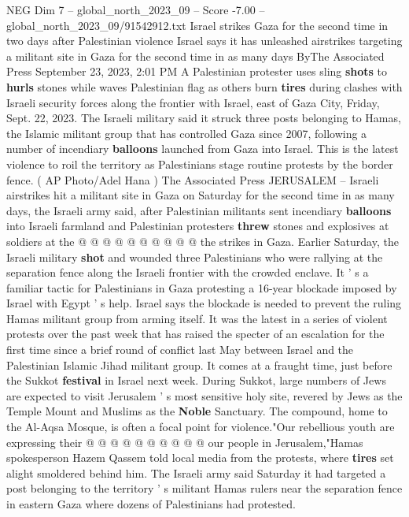 \begin{textsample}{NEG Dim 7 – global\_north\_2023\_09 – Score -7.00 – global\_north\_2023\_09/91542912.txt}  \label{ex:f7_neg_161}
Israel strikes Gaza for the second time in two days after Palestinian violence Israel says it has unleashed airstrikes targeting a militant site in Gaza for the second time in as many days ByThe Associated Press September 23, 2023, 2:01 PM A Palestinian protester uses sling \textbf{shots} to \textbf{hurls} stones while waves Palestinian flag as others burn \textbf{tires} during clashes with Israeli security forces along the frontier with Israel, east of Gaza City, Friday, Sept. 22, 2023.
The Israeli military said it struck three posts belonging to Hamas, the Islamic militant group that has controlled Gaza since 2007, following a number of incendiary \textbf{balloons} launched from Gaza into Israel.
This is the latest violence to roil the territory as Palestinians stage routine protests by the border fence. ( AP Photo/Adel Hana ) The Associated Press JERUSALEM -- Israeli airstrikes hit a militant site in Gaza on Saturday for the second time in as many days, the Israeli army said, after Palestinian militants sent incendiary \textbf{balloons} into Israeli farmland and Palestinian protesters \textbf{threw} stones and explosives at soldiers at the @ @ @ @ @ @ @ @ @ @ the strikes in Gaza.
Earlier Saturday, the Israeli military \textbf{shot} and wounded three Palestinians who were rallying at the separation fence along the Israeli frontier with the crowded enclave.
It ' s a familiar tactic for Palestinians in Gaza protesting a 16-year blockade imposed by Israel with Egypt ' s help.
Israel says the blockade is needed to prevent the ruling Hamas militant group from arming itself.
It was the latest in a series of violent protests over the past week that has raised the specter of an escalation for the first time since a brief round of conflict last May between Israel and the Palestinian Islamic Jihad militant group.
It comes at a fraught time, just before the Sukkot \textbf{festival} in Israel next week.
During Sukkot, large numbers of Jews are expected to visit Jerusalem ' s most sensitive holy site, revered by Jews as the Temple Mount and Muslims as the \textbf{Noble} Sanctuary.
The compound, home to the Al-Aqsa Mosque, is often a focal point for violence."Our rebellious youth are expressing their @ @ @ @ @ @ @ @ @ @ our people in Jerusalem,"Hamas spokesperson Hazem Qassem told local media from the protests, where \textbf{tires} set alight smoldered behind him.
The Israeli army said Saturday it had targeted a post belonging to the territory ' s militant Hamas rulers near the separation fence in eastern Gaza where dozens of Palestinians had protested.

\end{textsample}
